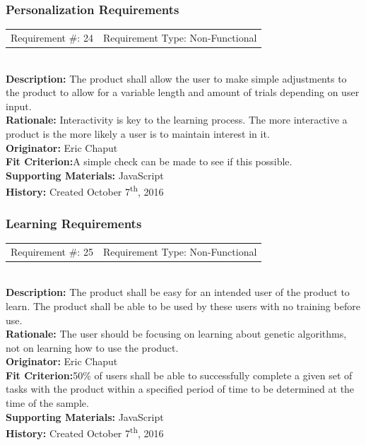 \documentclass[12pt, titlepage]{article}
\begin{document}
\subsubsection{Personalization Requirements}

\begin{reqbox}
%
\begin{tabular}{cc}
Requirement \#: 24 & Requirement Type: Non-Functional \\
\end{tabular} \\
%
\textbf{Description:} The product shall allow the user to make simple adjustments to the product to 
allow for a variable length and amount of trials depending on user input.  \\
\textbf{Rationale:}  Interactivity is key to the learning process. The more interactive a product is the more likely a user is to maintain interest in it.\\
\textbf{Originator:} Eric Chaput\\
\textbf{Fit Criterion:}A simple check can be made to see if this possible.\\
%  
\textbf{Supporting Materials:} JavaScript \\
\textbf{History:} Created October 7\textsuperscript{th}, 2016
%
\end{reqbox}

\subsubsection{Learning Requirements}

\begin{reqbox}
%
\begin{tabular}{cc}
Requirement \#: 25 & Requirement Type: Non-Functional \\
\end{tabular} \\
%
\textbf{Description:} The product shall be easy for an intended user of the product to learn. The 
product shall be able to be used by these users with no training before use.  \\
\textbf{Rationale:}  The user should be focusing on learning about genetic algorithms, not on learning how to use the product.\\
\textbf{Originator:} Eric Chaput\\
\textbf{Fit Criterion:}50\% of users shall be able to successfully complete a given 
set of tasks with the product within a specified period of time to be determined 
at the time of the sample.\\
%  
\textbf{Supporting Materials:} JavaScript \\
\textbf{History:} Created October 7\textsuperscript{th}, 2016
%
\end{reqbox}
\end{document}
